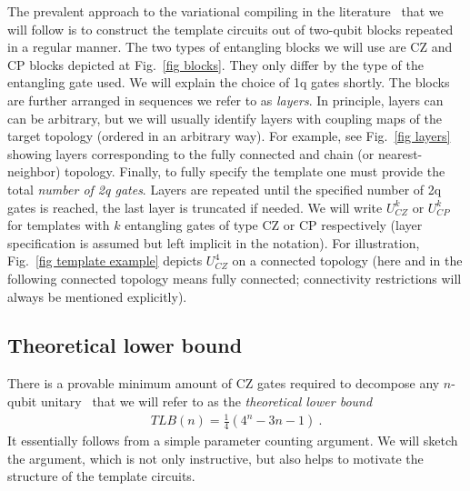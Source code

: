 \documentclass[draft, twocolumn, amsfonts, amssymb, aps, nofootinbib]{revtex4-2}
\newcommand{\CZ}{\textsf{CZ }}
\newcommand{\CP}{\textsf{CP }}
\begin{document}
The prevalent approach to the variational compiling in the literature~\cite{Khatri2019, Madden2021, Rakyta2021, Nakanishi2021, Rakyta2022} that we will follow is to construct the template circuits out of two-qubit blocks repeated in a regular manner. The two types of entangling blocks we will use are \CZ and \CP blocks depicted at Fig.~\ref{fig blocks}. They only differ by the type of the entangling gate used. We will explain the choice of 1q gates shortly. The blocks are further arranged in sequences we refer to as \textit{layers}. In principle, layers can can be arbitrary, but we will usually identify layers with coupling maps of the target topology (ordered in an arbitrary way). For example, see Fig.~\ref{fig layers} showing layers corresponding to the fully connected and chain (or nearest-neighbor) topology. Finally, to fully specify the template one must provide the total \textit{number of 2q gates}. Layers are repeated until the specified number of 2q gates is reached, the last layer is truncated if needed. We will write $U^k_{CZ}$ or $U^k_{CP}$ for templates with $k$ entangling gates of type \CZ or \CP respectively (layer specification is assumed but left implicit in the notation). For illustration, Fig.~\ref{fig template example} depicts $U^4_{CZ}$ on a connected topology (here and in the following connected topology means fully connected; connectivity restrictions will always be mentioned explicitly).


\subsection{Theoretical lower bound \label{sec tlb}}
There is a provable minimum amount of \CZ gates required to decompose any $n$-qubit unitary~\cite{Shende2004} that we will refer to as the \textit{theoretical lower bound}
\begin{align}
TLB(n) = \frac14\left(4^n-3n-1\right) \ . \label{TLB}
\end{align}
It essentially follows from a simple parameter counting argument. We will sketch the argument, which is not only instructive, but also helps to motivate the structure of the template circuits.
\end{document}
